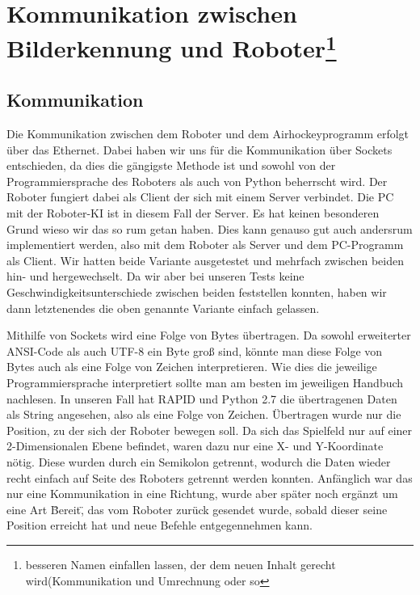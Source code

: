 
\chapter{Kommunikation zwischen Bilderkennung und Roboter\footnote{besseren Namen einfallen lassen, der dem neuen Inhalt gerecht wird(Kommunikation und Umrechnung oder so}}
\label{cha:Kommunikation zwischen Bilderkennung und Roboter}
\section{Kommunikation}
Die Kommunikation zwischen dem Roboter und dem Airhockeyprogramm erfolgt über das Ethernet. Dabei haben wir uns für die Kommunikation über Sockets entschieden, da dies die gängigste Methode ist und sowohl von der Programmiersprache des Roboters als auch von Python beherrscht wird. Der Roboter fungiert dabei als Client der sich mit einem Server verbindet. Die PC mit der Roboter-KI ist in diesem Fall der Server. Es hat keinen besonderen Grund wieso wir das so rum getan haben. Dies kann genauso gut auch andersrum implementiert werden, also mit dem Roboter als Server und dem PC-Programm als Client. Wir hatten beide Variante ausgetestet und mehrfach zwischen beiden hin- und hergewechselt. Da wir aber bei unseren Tests keine Geschwindigkeitsunterschiede zwischen beiden feststellen konnten, haben wir dann letztenendes die oben genannte Variante einfach gelassen.

Mithilfe von Sockets wird eine Folge von Bytes übertragen. Da sowohl erweiterter ANSI-Code als auch UTF-8 ein Byte groß sind, könnte man diese Folge von Bytes auch als eine Folge von Zeichen interpretieren. Wie dies die jeweilige Programmiersprache interpretiert sollte man am besten im jeweiligen Handbuch nachlesen. In unseren Fall hat RAPID und Python 2.7 die übertragenen Daten als String angesehen, also als eine Folge von Zeichen. 
Übertragen wurde nur die Position, zu der sich der Roboter bewegen soll.  Da sich das Spielfeld nur auf einer 2-Dimensionalen Ebene befindet, waren dazu nur eine X- und Y-Koordinate nötig. Diese wurden durch ein Semikolon getrennt, wodurch die Daten wieder recht einfach auf Seite des Roboters getrennt werden konnten. Anfänglich war das nur eine Kommunikation in eine Richtung, wurde aber später noch ergänzt um eine Art \"Bereit\", das vom Roboter zurück gesendet wurde, sobald dieser seine Position erreicht hat und neue Befehle entgegennehmen kann. 

